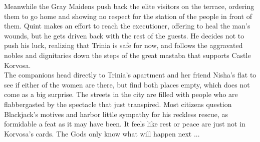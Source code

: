 Meanwhile the Gray Maidens push back the elite visitors on the terrace, ordering them to go home and showing no respect for the station of the people in front of them. Quint makes an effort to reach the executioner, offering to heal the man's wounds, but he gets driven back with the rest of the guests. He decides not to push his luck, realizing that Trinia is safe for now, and follows the aggravated nobles and dignitaries down the steps of the great mastaba that supports Castle Korvosa.\\

The companions head directly to Trinia's apartment and her friend Nisha's flat to see if either of the women are there, but find both places empty, which does not come as a big surprise. The streets in the city are filled with people who are flabbergasted by the spectacle that just transpired. Most citizens question Blackjack's motives and harbor little sympathy for his reckless rescue, as formidable a feat as it may have been. It feels like rest or peace are just not in Korvosa's cards. The Gods only know what will happen next ...\\

